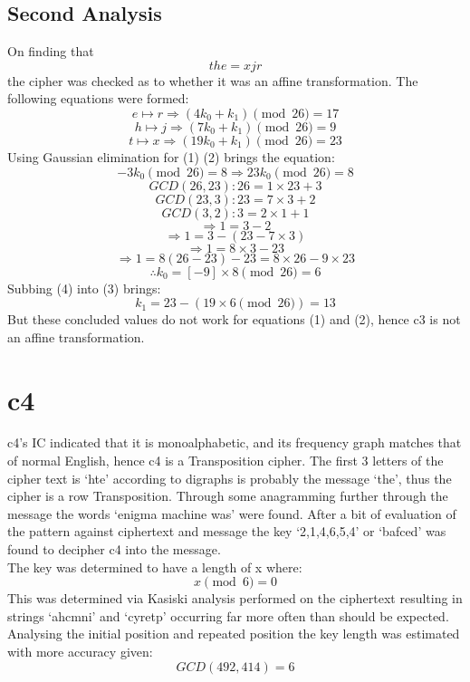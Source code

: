 \documentclass{article}
\begin{document}
      \subsection{Second Analysis}
      On finding that \[ the = xjr \] the cipher was checked as to whether it was an affine transformation. The 
      following equations were formed:
      \begin{equation}
        e \mapsto r \Rightarrow (4 k_0 + k_1) \pmod{26} = 17
      \end{equation}
      \begin{equation}
        h \mapsto j \Rightarrow (7 k_0 + k_1) \pmod{26} = 9
      \end{equation}
      \begin{equation}
        t \mapsto x \Rightarrow (19 k_0 + k_1) \pmod{26} = 23
       \end{equation}
       Using Gaussian elimination for (1) \- (2) brings the equation:
       \begin{equation}
         -3 k_0 \pmod{26} = 8 \Rightarrow 23 k_0 \pmod{26} = 8
       \end{equation}
       \[ GCD(26,23): 26 = 1 \times 23 + 3 \]
       \[ GCD(23,3):  23 = 7 \times 3 + 2 \] 
       \[ GCD(3,2): 3 = 2 \times 1 + 1 \] 
       \[ \Rightarrow 1 = 3 - 2 \] 
       \[ \Rightarrow 1 = 3 - (23 - 7 \times 3) \] 
       \[ \Rightarrow 1 = 8 \times 3 - 23 \] 
       \[ \Rightarrow 1 = 8(26 - 23) - 23 = 8 \times 26 - 9 \times 23 \]
       \begin{equation}
         \therefore k_0 = [-9] \times 8 \pmod{26} = 6
       \end{equation}
       Subbing (4) into (3) brings:
       \begin{equation}
         k_1 = 23 - (19 \times 6 \pmod{26}) = 13
       \end{equation}
       But these concluded values do not work for equations (1) and (2), hence c3 is not an affine transformation.
      \section{c4}
      c4's IC indicated that it is monoalphabetic, and its frequency graph matches that
      of normal English, hence c4 is a Transposition cipher. The first 3 letters of the
      cipher text is `hte' according to digraphs is probably the message `the', thus the
      cipher is a row Transposition. Through some anagramming further through the message 
      the words `enigma machine was' were found. After a bit of evaluation of the pattern 
      against ciphertext and message the key `2,1,4,6,5,4' or `bafced' was found to decipher 
      c4 into the message. \\
      The key was determined to have a length of x where: \[ x \pmod 6 = 0 \] %
      This was determined via Kasiski analysis performed on the ciphertext resulting in strings 
      `ahcmni' and `cyretp' occurring far more often than should be expected.
      Analysing the initial position and repeated position the key length was estimated
      with more accuracy given: \[ GCD(492,414) = 6 \]
\end{document}
